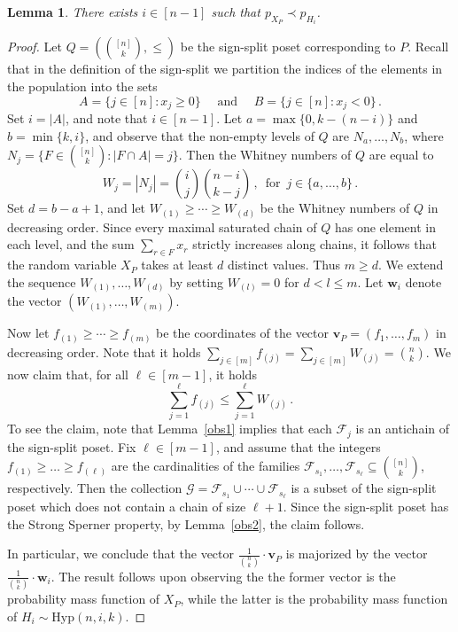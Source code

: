 \documentclass[11pt]{article}
\newtheorem{lemma}{Lemma}
\begin{document}
\begin{lemma}\label{maj_lemma}
There exists $i\in [n-1]$ such that $p_{X_P} \prec p_{H_i}$.  
\end{lemma}
\begin{proof}
Let $Q=(\binom{[n]}{k}, \le)$ be the sign-split poset corresponding to $P$. 
Recall that in the definition of the sign-split we partition the indices of the elements in the population into the sets
\[
A=\{j\in [n]: x_j \ge 0\} \quad\text{ and }\quad B = \{j\in [n] : x_j < 0\} \, .
\]
Set $i=|A|$, and note that $i\in [n-1]$. 
Let
$a=\max\{0,k-(n-i)\}$ and $b=\min\{k,i\}$, and observe that the non-empty levels of $Q$ are $N_a,\ldots,N_b$, where $N_j = \{F\in \binom{[n]}{k} : |F\cap A| =j \}$. 
Then the Whitney numbers of $Q$  
are equal to 
\[
W_j = |N_j| = \binom{i}{j}\binom{n-i}{k-j} \, , \, \text{ for } \, j\in \{a,\ldots,b\}\, .
\]
Set $d = b-a+1$, and let $W_{(1)}\ge \cdots\ge W_{(d)}$ be the Whitney numbers of $Q$ in decreasing order.  
Since every maximal saturated chain of
$Q$ has one element in each level, and the sum $\sum_{r\in F}x_r$  strictly increases along chains, it follows that 
the random variable $X_P$ takes at least $d$ distinct values. Thus $m\ge d$.  We extend the
sequence $W_{(1)},\ldots,W_{(d)}$ by setting \(W_{(l)}=0\) for $d<l\leq m$.  Let $\mathbf{w}_i$ denote the vector $(W_{(1)},\ldots,W_{(m)})$. 


Now let $f_{(1)}\ge \cdots \ge f_{(m)}$ be the coordinates of the  vector
$\mathbf{v}_P = (f_1,\ldots,f_m)$ in decreasing order.  
Note that it holds $\sum_{j\in [m]}f_{(j)}=\sum_{j\in [m]}W_{(j)}=\binom{n}{k}$.
We now claim that,  for all 
$\ell\in [m-1]$, it holds 
\[
\sum_{j=1}^{\ell} f_{(j)} \le \sum_{j=1}^{\ell} W_{(j)} \, .
\]
To see the claim, note that  Lemma~\ref{obs1} implies that each $\mathcal{F}_j$ is an antichain of the sign-split poset. Fix $\ell\in [m-1]$, 
and assume that the integers $f_{(1)}\ge\ldots \ge f_{(\ell)}$ are the cardinalities of the families $\mathcal{F}_{s_1},\ldots,\mathcal{F}_{s_{\ell}}\subseteq \binom{[n]}{k}$, respectively. 
Then the collection $\mathcal{G} = \mathcal{F}_{s_1}\cup \cdots\cup \mathcal{F}_{s_{\ell}}$ is a subset of the sign-split poset which does not contain a chain of size $\ell+1$.  
Since the sign-split poset has the Strong Sperner property, by Lemma~\ref{obs2}, the claim follows. 

In particular, we conclude that the vector 
$\frac{1}{\binom{n}{k}}\cdot \mathbf{v}_P$ is majorized by the vector $\frac{1}{\binom{n}{k}}\cdot \mathbf{w}_i$. 
The result follows upon observing the the former vector is the probability mass function of $X_P$, while the latter is the probability mass function of $H_i\sim\text{Hyp}(n,i,k)$. 
\end{proof}
\end{document}

